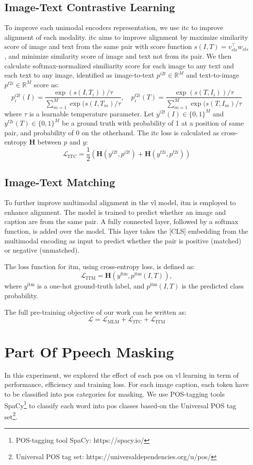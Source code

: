 \subsection{Image-Text Contrastive Learning}
To improve each unimodal encoders representation, we use \acrlong{itc} to improve alignment of each modality.
\acrshort{itc} aims to improve alignment by maximize similarity score of image and text from the same pair with score function \(s(I, T) = v_{cls}^\top w_{cls}\), and minimize similarity score of image and text not from its pair.
We then calculate softmax-normalized similiarity score for each image to any text and each text to any image, identified as image-to-text \(p^{i2t} \in \mathbb{R}^{M}\) and text-to-image \(p^{t2i} \in \mathbb{R}^{M}\) score as:
\[
    p^{i2t}_i(I) = \frac{ \exp{(s(I,T_i))/\tau} }{ \sum_{m=1}^{M}\exp{(s(I,T_m)/\tau} }, \quad p^{t2i}_i(T) = \frac{ \exp{(s(T,I_i))/\tau} }{ \sum_{m=1}^{M}\exp{(s(T,I_m)/\tau} }
\]
where \(\tau\) is a learnable temperature parameter. Let \( y^{i2t}(I) \in \{0,1\}^M \) and \( y^{t2i}(T) \in \{0,1\}^M \) be a ground truth with probability of 1 at a position of same pair, and probability of 0 on the otherhand.
The \acrshort{itc} loss is calculated as cross-entropy \(\mathbf{H}\) between \(p\) and \(y\):
\[
    \mathcal{L}_{\text{ITC}} = \frac{1}{2}(\mathbf{H}(y^{i2t},p^{i2t}) + \mathbf{H}(y^{t2i},p^{t2i}))
\]
\subsection{Image-Text Matching}
To further improve multimodal alignment in the \acrshort{vl} model, \acrlong{itm} is employed to enhance alignment. 
The model is trained to predict whether an image and caption are from the same pair. 
A fully connected layer, followed by a softmax function, is added over the model. 
This layer takes the [CLS] embedding from the multimodal encoding as input to predict whether the pair is positive (matched) or negative (unmatched). 

The loss function for \acrshort{itm}, using cross-entropy loss, is defined as:
\[
    \mathcal{L}_{\text{ITM}} = \mathbf{H}(y^{\text{itm}}, p^{\text{itm}}(I, T)),
\]
where \(y^{\text{itm}}\) is a one-hot ground-truth label, and \(p^{\text{itm}}(I, T)\) is the predicted class probability.

The full pre-training objective of our work can be written as:
\[
    \mathcal{L} = \mathcal{L}_{\text{MLM}} + \mathcal{L}_{\text{ITC}} + \mathcal{L}_{\text{ITM}}
\]

\section{Part Of Ppeech Masking}
In this experiment, we explored the effect of each \acrshort{pos} on \acrshort{vl} learning in term of performance, efficiency and training loss.
For each image caption, each token have to be classified into \acrshort{pos} categories for masking.
We use POS-tagging tools SpaCy\footnote{POS-tagging tool SpaCy: https://spacy.io/} to classify each word into \acrshort{pos} classes based-on the Universal POS tag set\footnote{Universal POS tag set: https://universaldependencies.org/u/pos/}.

